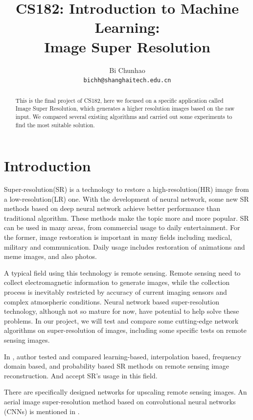 \documentclass{article}
\title{CS182: Introduction to Machine Learning: \\ Image Super Resolution}
\author{
  Bi Chunhao\\
  \texttt{bichh@shanghaitech.edu.cn} \\
}
\begin{document}
\maketitle

\begin{abstract}
  This is the final project of CS182, here we focused on a specific application called Image Super Resolution,
  which generates a higher resolution images based on the raw input. 
  We compared several existing algorithms and carried out some experiments to find the most suitable solution.
  \end{abstract}
  
  \section{Introduction}
  Super-resolution(SR) is a technology to restore a high-resolution(HR) image from a low-resolution(LR) one. 
  With the development of neural network, some new SR methods based on deep neural network achieve better performance than traditional algorithm. 
  These methods make the topic more and more popular. SR can be used in many areas, from commercial usage to daily entertainment. 
  For the former, image restoration is important in many fields including medical, military and communication. 
  Daily usage includes restoration of animations and meme images, and also photos.
  
  A typical field using this technology is remote sensing. 
  Remote sensing need to collect electromagnetic information to generate images, while the collection process is inevitably restricted by accuracy of current imaging sensors and complex atmospheric conditions. 
  Neural network based super-resolution technology, although not so mature for now, have potential to help solve these problems. 
  In our project, we will test and compare some cutting-edge network algorithms on super-resolution of images, including some specific tests on remote sensing images.
  
  In \cite{9}, author tested and compared learning-based, interpolation based, frequency domain based, 
  and probability based SR methods on remote sensing image reconstruction. And accept SR's usage in this field.
  
  There are specifically designed networks for upscaling remote sensing images. 
  An aerial image super-resolution method based on convolutional neural networks (CNNs) is mentioned in  \cite{10}.
  
\end{document}
